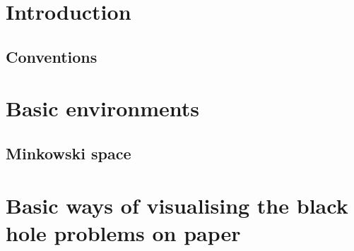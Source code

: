 \documentclass[english, a4, 12pt]{scrartcl}
\begin{document}

%				
%				
%				
	
\thispagestyle{empty}
\tableofcontents	
\clearpage	
\setcounter{page}{1}
\section{Introduction}
	\cite{JerusalemLectures}
	\subsection{Conventions}
\section{Basic environments}
	
	\subsection{Minkowski space}
	 

	
	 	
	
			
\section{Basic ways of visualising the black hole problems on paper}
	
\end{document}
